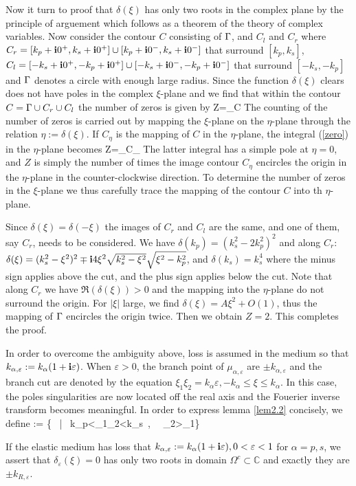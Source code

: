 \documentclass[12pt]{iopart}
\begin{document}
Now it turn to proof that $\delta(\xi)$ has only two roots in the complex plane by the principle of arguement which follows as a theorem of the theory of complex variables\cite{Ahlfors1979Complex}. Now consider the contour $C$ consisting of $\Gamma$, and $C_l$ and $C_r$ where $C_r=[k_p+\mathbf{i}0^+,k_s+\mathbf{i}0^+]\cup[k_p+\mathbf{i}0^-,k_s+\mathbf{i}0^-]$ that surround $[k_p,k_s]$, $C_l=[-k_s+\mathbf{i}0^+,-k_p+\mathbf{i}0^+]\cup[-k_s+\mathbf{i}0^-,-k_p+\mathbf{i}0^-]$ that surround $[-k_s,-k_p]$ and $\Gamma$ denotes a circle with enough large radius. Since the function $\delta(\xi)$ clears does not have poles in the complex $\xi$-plane and we find that within the contour $C=\Gamma\cup C_r\cup C_l$ the number of zeros is given by
\be \label{zero}
Z=\int_C 
\ee
The counting of the number of zeros is carried out by mapping the $\xi$-plane on the $\eta$-plane through the relation $\eta:=\delta(\xi)$.
If $C_\eta$ is the mapping of $C$ in the $\eta$-plane, the integral (\ref{zero})
in the $\eta$-plane becomes
\be
Z=\int_{C_\eta} 
\ee
The latter integral has a simple pole at $\eta=0$, and $Z$ is simply the number of times the image contour $C_\eta$ encircles the origin in the $\eta$-plane in the counter-clockwise direction. To determine the number of zeros in the $\xi$-plane we thus carefully trace the mapping of the contour $C$ into th $\eta$-plane.

Since $\delta(\xi)=\delta(-\xi)$ the images of $C_r$ and $C_l$ are the same, and one of them, say $C_r$, needs to be considered. We have $\delta(k_p)=(k_s^2-2k_p^2)^2$ and along $C_r$: $\delta(\xi)=(k_s^2-\xi^2)^2\mp\mathbf{i}4\xi^2\sqrt{k_s^2-\xi^2}\sqrt{\xi^2-k_p^2}$, and $\delta(k_s)=k_s^4$ where the minus sign applies above the cut, and the plus sign applies below the cut. Note that along $C_r$ we have $\Re(\delta(\xi))>0$ and the mapping into the $\eta$-plane do not surround the origin. For $|\xi|$ large, we find $\delta(\xi)=A\xi^2+O(1)$, thus the mapping of $\Gamma$ encircles the origin twice. Then we obtain $Z=2$. This completes the proof.
\finproof

In order to overcome the ambiguity above, loss is assumed in the medium so that $k_{\alpha,\varepsilon}:=k_\alpha(1+\mathbf{i}\varepsilon)$.
When $\varepsilon>0$, the branch point of $\mu_{\alpha,\varepsilon}$ are $\pm k_{\alpha,\varepsilon}$ and the branch cut are denoted by the equation $\xi_1\xi_2=k_\alpha \varepsilon,-k_\alpha\leq \xi \leq k_\alpha$. In this case, the poles singularities are now located off the real axis and the Fouerier inverse transform becomes meaningful. In order to express lemma \ref{lem2.2} concisely, we define
\be
\Omega := \{\xi \in {} \ | \ k_p\varepsilon<\xi_1\xi_2<k_s\varepsilon \ , \  \ \xi_2>\xi_1\varepsilon\}
\ee
\begin{lem}\label{lem2.2}
	If the elastic medium has loss that $k_{\alpha,\varepsilon}:=k_\alpha(1+\mathbf{i}\varepsilon),0<\varepsilon<1$ for $\alpha=p,s$, we assert that $\delta_\varepsilon(\xi)=0$ has only two roots in domain $\Omega^c \subset \mathbb{C}$ and exactly they are $\pm k_{R,\varepsilon}$.
\end{lem}
\end{document}
